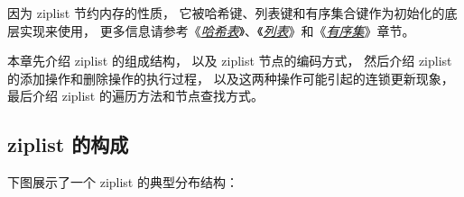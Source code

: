 \documentclass[a4paper,11pt,english]{sphinxmanual}
\begin{document}
因为 ziplist 节约内存的性质，
它被哈希键、列表键和有序集合键作为初始化的底层实现来使用，
更多信息请参考《{\hyperref[datatype/hash:hash-chapter]{\emph{哈希表}}}》、《{\hyperref[datatype/list:list-chapter]{\emph{列表}}}》和《{\hyperref[datatype/sorted_set:sorted-set-chapter]{\emph{有序集}}}》章节。

本章先介绍 ziplist 的组成结构，
以及 ziplist 节点的编码方式，
然后介绍 ziplist 的添加操作和删除操作的执行过程，
以及这两种操作可能引起的连锁更新现象，
最后介绍 ziplist 的遍历方法和节点查找方式。


\subsection{ziplist 的构成}
\label{compress-datastruct/ziplist:ziplist}
下图展示了一个 ziplist 的典型分布结构：
\end{document}
